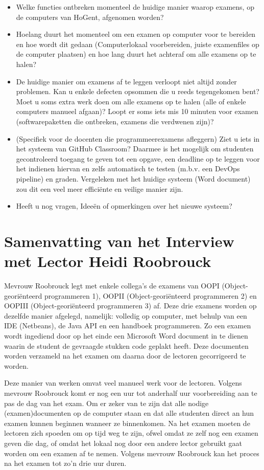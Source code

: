 \begin{itemize}
\begin{itemize}
\end{itemize}	
	\bigskip 
	\item Welke functies ontbreken momenteel de huidige manier waarop examens, op de computers van HoGent, afgenomen worden?
	\bigskip 
	\item Hoelang duurt het momenteel om een examen op computer voor te bereiden en hoe wordt dit gedaan (Computerlokaal voorbereiden, juiste examenfiles op de computer plaatsen) en hoe lang duurt het achteraf om alle examens op te halen?
	\bigskip 
	\item De huidige manier om examens af te leggen verloopt niet altijd zonder problemen. Kan u enkele defecten opsommen die u reeds tegengekomen bent? Moet u soms extra werk doen om alle examens op te halen (alle of enkele computers manueel afgaan)? Loopt er soms iets mis 10 minuten voor examen (softwarepaketten die ontbreken, examens die verdwenen zijn)? 
	\bigskip
	\item (Specifiek voor de docenten die programmeerexamens afleggern) Ziet u iets in het systeem van GitHub Classroom? Daarmee is het mogelijk om studenten gecontroleerd toegang te geven tot een opgave, een deadline op te leggen voor het indienen hiervan en zelfs automatisch te testen (m.b.v. een DevOps pipeline) en graden. Vergeleken met het huidige systeem (Word document) zou dit een veel meer efficiënte en veilige manier zijn.
	\bigskip 
	\item Heeft u nog vragen, Ideeën of opmerkingen over het nieuwe systeem?
	
\end{itemize}

\section{Samenvatting van het Interview met Lector Heidi Roobrouck}

Mevrouw Roobrouck legt met enkele collega's de examens van OOPI (Object-georiënteerd programmeren 1), OOPII (Object-georiënteerd programmeren 2) en OOPIII (Object-georiënteerd programmeren 3) af. Deze drie examens worden op dezelfde manier afgelegd, namelijk: volledig op computer, met behulp van een IDE (Netbeans), de Java API en een handboek programmeren. Zo een examen wordt ingediend door op het einde een Microsoft Word document in te dienen waarin de student de gevraagde stukken code geplakt heeft. Deze documenten worden verzameld na het examen om daarna door de lectoren gecorrigeerd te worden. 
\medskip 

Deze manier van werken omvat veel manueel werk voor de lectoren. Volgens mevrouw Roobrouck komt er nog een uur tot anderhalf uur voorbereiding aan te pas de dag van het exam. Om er zeker van te zijn dat alle nodige (examen)documenten op de computer staan en dat alle studenten direct an hun examen kunnen beginnen wanneer ze binnenkomen. Na het examen moeten de lectoren zich spoeden om op tijd weg te zijn, ofwel omdat ze zelf nog een examen geven die dag, of omdat het lokaal nog door een andere lector gebruikt gaat worden om een examen af te nemen. Volgens mevrouw Roobrouck kan het proces na het examen tot zo'n drie uur duren.  

